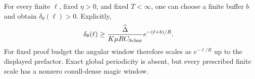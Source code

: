 \begin{corollary}
\label{cor:r7-any-scale}
For every finite $\ell$, fixed $\eta>0$, and fixed $T<\infty$, one can choose
a finite buffer $b$ and obtain $\delta_\theta(\ell)>0$.  Explicitly,
\begin{equation}
 \delta_\theta(\ell)
 \ge \frac{\widehat\Delta}{K\mu RC_{\rm Schur}}
 e^{-(\ell+b)/R}.
 \label{eq:r7-exponential-window}
\end{equation}
For fixed proof budget the angular window therefore scales as
$e^{-\ell/R}$ up to the displayed prefactor.  Exact global periodicity is
absent, but every prescribed finite scale has a nonzero conull-dense magic
window.
\end{corollary}
